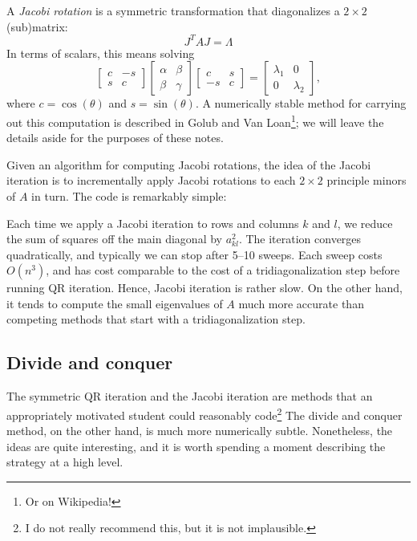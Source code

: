 \documentclass[12pt, leqno]{article} %
\begin{document}
A {\em Jacobi rotation} is a symmetric transformation that
diagonalizes a $2 \times 2$ (sub)matrix:
\[
  J^T A J = \Lambda
\]
In terms of scalars, this means solving
\[
  \begin{bmatrix} c & -s \\ s & c \end{bmatrix}
  \begin{bmatrix} \alpha & \beta \\ \beta & \gamma \end{bmatrix}
  \begin{bmatrix} c & s \\ -s & c \end{bmatrix} =
  \begin{bmatrix} \lambda_1 & 0 \\ 0 & \lambda_2 \end{bmatrix},
\]
where $c = \cos(\theta)$ and $s = \sin(\theta)$.  A numerically
stable method for carrying out this computation is described in
Golub and Van Loan\footnote{Or on Wikipedia!}; we will leave
the details aside for the purposes of these notes.

Given an algorithm for computing Jacobi rotations, the idea
of the Jacobi iteration is to incrementally apply Jacobi rotations
to each $2 \times 2$ principle minors of $A$ in turn.  The code is
remarkably simple:



Each time we apply a Jacobi iteration to rows and columns $k$ and $l$,
we reduce the sum of squares off the main diagonal by $a_{kl}^2$. The
iteration converges quadratically, and typically we can stop after 5--10
sweeps.  Each sweep costs $O(n^3)$, and has cost comparable to the cost
of a tridiagonalization step before running QR iteration.  Hence, Jacobi
iteration is rather slow.  On the other hand, it tends to compute the
small eigenvalues of $A$ much more accurate than competing methods that
start with a tridiagonalization step.

\subsection{Divide and conquer}

The symmetric QR iteration and the Jacobi iteration are methods that
an appropriately motivated student could reasonably code\footnote{%
I do not really recommend this, but it is not implausible.}
The divide and conquer method, on the other hand, is much more
numerically subtle.  Nonetheless, the ideas are quite interesting,
and it is worth spending a moment describing the strategy at a
high level.
\end{document}
